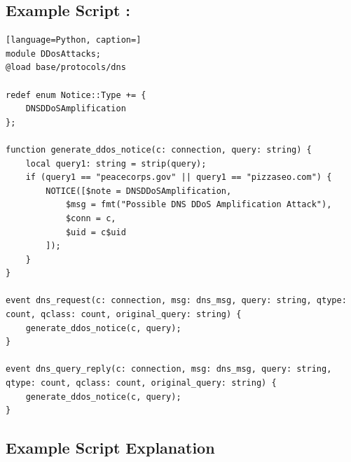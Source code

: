 \subsection{Example Script :}
\begin{lstlisting}[language=Python, caption=]
module DDosAttacks;
@load base/protocols/dns

redef enum Notice::Type += {
    DNSDDoSAmplification
};

function generate_ddos_notice(c: connection, query: string) {
    local query1: string = strip(query);
    if (query1 == "peacecorps.gov" || query1 == "pizzaseo.com") {
        NOTICE([$note = DNSDDoSAmplification,
            $msg = fmt("Possible DNS DDoS Amplification Attack"),
            $conn = c,
            $uid = c$uid
        ]);
    }
}

event dns_request(c: connection, msg: dns_msg, query: string, qtype: count, qclass: count, original_query: string) {
    generate_ddos_notice(c, query);
}

event dns_query_reply(c: connection, msg: dns_msg, query: string, qtype: count, qclass: count, original_query: string) {
    generate_ddos_notice(c, query);
}
\end{lstlisting}

\subsection{Example Script Explanation}

